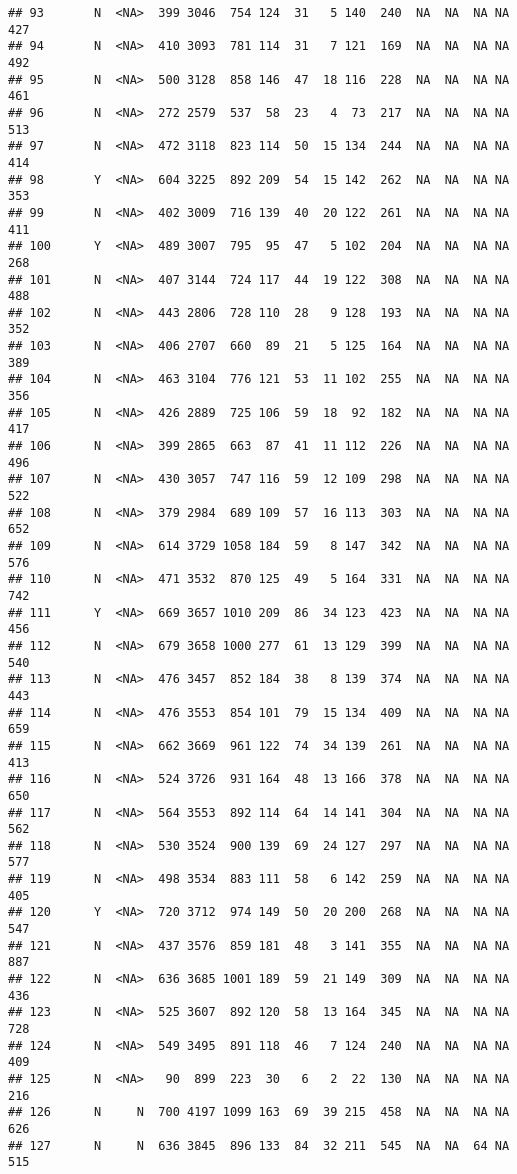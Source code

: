 \documentclass[]{article}
\begin{document}
\begin{verbatim}
## 93       N  <NA>  399 3046  754 124  31   5 140  240  NA  NA  NA NA  427
## 94       N  <NA>  410 3093  781 114  31   7 121  169  NA  NA  NA NA  492
## 95       N  <NA>  500 3128  858 146  47  18 116  228  NA  NA  NA NA  461
## 96       N  <NA>  272 2579  537  58  23   4  73  217  NA  NA  NA NA  513
## 97       N  <NA>  472 3118  823 114  50  15 134  244  NA  NA  NA NA  414
## 98       Y  <NA>  604 3225  892 209  54  15 142  262  NA  NA  NA NA  353
## 99       N  <NA>  402 3009  716 139  40  20 122  261  NA  NA  NA NA  411
## 100      Y  <NA>  489 3007  795  95  47   5 102  204  NA  NA  NA NA  268
## 101      N  <NA>  407 3144  724 117  44  19 122  308  NA  NA  NA NA  488
## 102      N  <NA>  443 2806  728 110  28   9 128  193  NA  NA  NA NA  352
## 103      N  <NA>  406 2707  660  89  21   5 125  164  NA  NA  NA NA  389
## 104      N  <NA>  463 3104  776 121  53  11 102  255  NA  NA  NA NA  356
## 105      N  <NA>  426 2889  725 106  59  18  92  182  NA  NA  NA NA  417
## 106      N  <NA>  399 2865  663  87  41  11 112  226  NA  NA  NA NA  496
## 107      N  <NA>  430 3057  747 116  59  12 109  298  NA  NA  NA NA  522
## 108      N  <NA>  379 2984  689 109  57  16 113  303  NA  NA  NA NA  652
## 109      N  <NA>  614 3729 1058 184  59   8 147  342  NA  NA  NA NA  576
## 110      N  <NA>  471 3532  870 125  49   5 164  331  NA  NA  NA NA  742
## 111      Y  <NA>  669 3657 1010 209  86  34 123  423  NA  NA  NA NA  456
## 112      N  <NA>  679 3658 1000 277  61  13 129  399  NA  NA  NA NA  540
## 113      N  <NA>  476 3457  852 184  38   8 139  374  NA  NA  NA NA  443
## 114      N  <NA>  476 3553  854 101  79  15 134  409  NA  NA  NA NA  659
## 115      N  <NA>  662 3669  961 122  74  34 139  261  NA  NA  NA NA  413
## 116      N  <NA>  524 3726  931 164  48  13 166  378  NA  NA  NA NA  650
## 117      N  <NA>  564 3553  892 114  64  14 141  304  NA  NA  NA NA  562
## 118      N  <NA>  530 3524  900 139  69  24 127  297  NA  NA  NA NA  577
## 119      N  <NA>  498 3534  883 111  58   6 142  259  NA  NA  NA NA  405
## 120      Y  <NA>  720 3712  974 149  50  20 200  268  NA  NA  NA NA  547
## 121      N  <NA>  437 3576  859 181  48   3 141  355  NA  NA  NA NA  887
## 122      N  <NA>  636 3685 1001 189  59  21 149  309  NA  NA  NA NA  436
## 123      N  <NA>  525 3607  892 120  58  13 164  345  NA  NA  NA NA  728
## 124      N  <NA>  549 3495  891 118  46   7 124  240  NA  NA  NA NA  409
## 125      N  <NA>   90  899  223  30   6   2  22  130  NA  NA  NA NA  216
## 126      N     N  700 4197 1099 163  69  39 215  458  NA  NA  NA NA  626
## 127      N     N  636 3845  896 133  84  32 211  545  NA  NA  64 NA  515

\end{verbatim}
\end{document}
